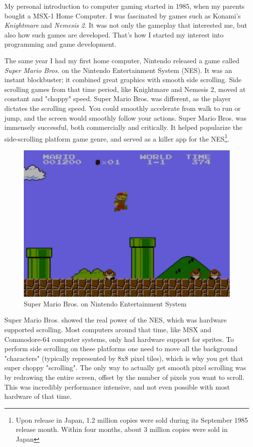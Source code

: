 \documentclass[book.tex]{subfiles}
\begin{document}
My personal introduction to computer gaming started in 1985, when my parents bought a MSX-1 Home Computer. I was fascinated by games such as Konami's \textit{Knightmare} and \textit{Nemesis 2}. It was not only the gameplay that interested me, but also how such games are developed. That's how I started my interest into programming and game development.\\
\par
The same year I had my first home computer, Nintendo released a game called \textit{Super Mario Bros.} on the Nintendo Entertainment System (NES). It was an instant blockbuster; it combined great graphics with smooth side scrolling. Side scrolling games from that time period, like Knightmare and Nemesis 2, moved at constant and "choppy" speed. Super Mario Bros. was different, as the player dictates the scrolling speed. You could smoothly accelerate from walk to run or jump, and the screen would smoothly follow your actions. Super Mario Bros. was immensely successful, both commercially and critically. It helped popularize the side-scrolling platform game genre, and served as a killer app for the NES\footnote{Upon release in Japan, 1.2 million copies were sold during its September 1985 release month. Within four months, about 3 million copies were sold in Japan}.\\
\begin{figure}[H]
  \centering
 \includegraphics[width=1.0\textwidth]{screenshots_300dpi/Mario_Bros.png}
\caption{Super Mario Bros. on Nintendo Entertainment System}
\end{figure}
\par
Super Mario Bros. showed the real power of the NES, which was hardware supported scrolling. Most computers around that time, like MSX and Commodore-64 computer systems, only had hardware support for sprites. To perform side scrolling on these platforms one  need to move all the background "characters" (typically represented by 8x8 pixel tiles), which is why you get that super choppy "scrolling". The only way to actually get smooth pixel scrolling was by redrawing the entire screen, offset by the number of pixels you want to scroll. This was incredibly performance intensive, and not even possible with most hardware of that time. \\
\end{document}
